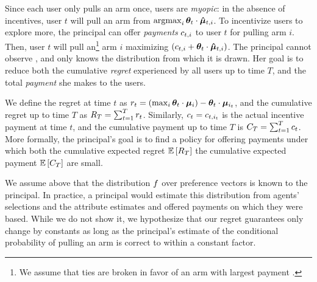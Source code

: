 Since each user only pulls an arm once, users are \emph{myopic}:
in the absence of incentives, user $t$ will pull an arm from
$\mathop{\mathrm{argmax}}_i \bm{\theta}_{t} \cdot \bm{\hat{\mu}}_{t,i}$.
To incentivize users to explore more, the principal can offer
\emph{payments} $c_{t,i}$ to user $t$ for pulling arm $i$.
Then, user $t$ will pull an\footnote{We assume that ties are broken in
  favor of an arm with largest payment .}
arm $i$ maximizing $(c_{t,i} + \bm{\theta}_{t} \cdot \bm{\hat{\mu}}_{t,i})$.
The principal cannot observe ,
and only knows the distribution \AgentDist from which it is drawn.
Her goal is to reduce both the cumulative
\emph{regret} experienced by all users up to time $T$,
and the total \emph{payment} she makes to the users.

We define the regret at time $t$ as
$r_{t} = (\max_{i} \bm{\theta}_{t} \cdot \bm{\mu}_{i}) - \bm{\theta}_{t} \cdot \bm{\mu}_{i_{t}}$,
and the cumulative regret up to time $T$ as
$R_{T} = \sum_{t=1}^{T} r_{t}$.
Similarly, $c_{t} = c_{t,i_{t}}$ is the actual incentive
payment at time $t$,
and the cumulative payment up to time $T$ is
$C_{T} = \sum_{t=1}^{T} c_{t}$.
More formally, the principal's goal is to find a policy
\POLICY for offering payments under which both the cumulative expected
regret
$\Expect{\TotalRegret{T}}$ the cumulative expected payment
$\Expect{\TotalPay{T}}$ are small.

We assume above that the distribution $f$ over preference
vectors is known to the principal.
In practice, a principal would estimate this distribution from agents'
selections and the attribute estimates and offered payments on which
they were based.
While we do not show it, we hypothesize that our regret guarantees
only change by constants as long as the principal's estimate of the
conditional probability of pulling an arm is correct to within a
constant factor.

